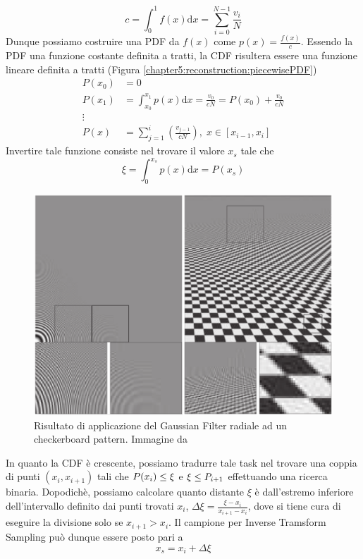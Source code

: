 \begin{equation}
	c=\int_0^1 f(x)\mathrm{d}x=\sum_{i=0}^{N-1}\frac{v_i}{N}
\end{equation}
Dunque possiamo costruire una PDF da $f(x)$ come $p(x)=\tfrac{f(x)}{c}$. Essendo la PDF una funzione costante definita a tratti, la CDF risultera 
essere una funzione lineare definita a tratti (Figura \ref{chapter5:reconstruction:piecewisePDF})
\begin{align}
	P(x_0)&=0\nonumber\\
	P(x_1)&=\int_{x_0}^{x_1}p(x)\mathrm{d}x=\frac{v_0}{cN}=P(x_0)+\frac{v_0}{cN}\nonumber\\
	\vdots\nonumber\\
	P(x)&=\sum_{j=1}^{i}\left(\frac{v_{j-1}}{cN}\right),\;x\in[x_{i-1},x_i]
\end{align}
Invertire tale funzione consiste nel trovare il valore $x_s$ tale che
\begin{equation*}
	\xi=\int_0^{x_s}p(x)\mathrm{d}x=P(x_s)
\end{equation*}
\begin{figure}[tb!]
	\centering
	\includegraphics[width=0.75\linewidth]{../assets/chapter5_reconstruction_gaussian_result.png}
	\caption{Risultato di applicazione del Gaussian Filter radiale ad un checkerboard pattern. Immagine da \cite{pegoraro}}
	\label{chapter5:reconstruction:gaussianResult}
\end{figure}
In quanto la CDF \`e crescente, possiamo tradurre tale task nel trovare una coppia di punti $(x_i,x_{i+1})$ tali che $\mathmakebox{P(x_i)\leq\xi}$ e 
$\mathmakebox{\xi\leq P_{i+1}}$ effettuando una ricerca binaria. Dopodich\`e, possiamo calcolare quanto distante $\xi$ \`e dall'estremo inferiore 
dell'intervallo definito dai punti trovati $x_i$, $\Delta\xi=\frac{\xi-x_i}{x_{i+1}-x_i}$, dove si tiene cura di eseguire la divisione solo se
$x_{i+1}>x_i$. Il campione per Inverse Tramsform Sampling pu\`o dunque essere posto pari a 
\begin{equation}
	x_s = x_i + \Delta\xi
\end{equation}
